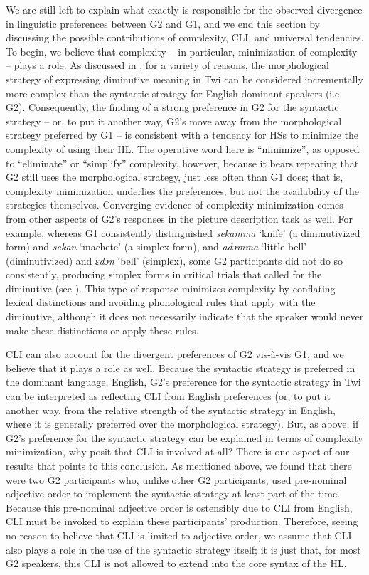 \documentclass[output=paper,colorlinks,citecolor=brown]{langscibook}
\begin{document}
We are still left to explain what exactly is responsible for the observed divergence in linguistic preferences between G2 and G1, and we end this section by discussing the possible contributions of complexity, CLI, and universal tendencies. To begin, we believe that complexity -- in particular, minimization of complexity -- plays a role. As discussed in , for a variety of reasons, the morphological strategy of expressing diminutive meaning in Twi can be considered incrementally more complex than the syntactic strategy for English-dominant speakers (i.e. G2). Consequently, the finding of a strong preference in G2 for the syntactic strategy -- or, to put it another way, G2's move away from the morphological strategy preferred by G1 -- is consistent with a tendency for HSs to minimize the complexity of using their HL. The operative word here is ``minimize'', as opposed to ``eliminate'' or ``simplify'' complexity, however, because it bears repeating that G2 still uses the morphological strategy, just less often than G1 does; that is, complexity minimization underlies the preferences, but not the availability of the strategies themselves. Converging evidence of complexity minimization comes from other aspects of G2's responses in the picture description task as well. For example, whereas G1 consistently distinguished \textit{sekamma} `knife' (a diminutivized form) and \textit{sekan} `machete' (a simplex form), and \textit{adɔmma} `little bell' (diminutivized) and \textit{ɛdɔn} `bell' (simplex), some G2 participants did not do so consistently, producing simplex forms in critical trials that called for the diminutive (see ). This type of response minimizes complexity by conflating lexical distinctions and avoiding phonological rules that apply with the diminutive, although it does not necessarily indicate that the speaker would never make these distinctions or apply these rules.

CLI can also account for the divergent preferences of G2 vis-{\`a}-vis G1, and we believe that it plays a role as well. Because the syntactic strategy is preferred in the dominant language, English, G2's preference for the syntactic strategy in Twi can be interpreted as reflecting CLI from English preferences (or, to put it another way, from the relative strength of the syntactic strategy in English, where it is generally preferred over the morphological strategy). But, as above, if G2's preference for the syntactic strategy can be explained in terms of complexity minimization, why posit that CLI is involved at all? There is one aspect of our results that points to this conclusion. As mentioned above, we found that there were two G2 participants who, unlike other G2 participants, used pre-nominal adjective order to implement the syntactic strategy at least part of the time. Because this pre-nominal adjective order is ostensibly due to CLI from English, CLI must be invoked to explain these participants' production. Therefore, seeing no reason to believe that CLI is limited to adjective order, we assume that CLI also plays a role in the use of the syntactic strategy itself; it is just that, for most G2 speakers, this CLI is not allowed to extend into the core syntax of the HL.\largerpage[-2]
\end{document}
